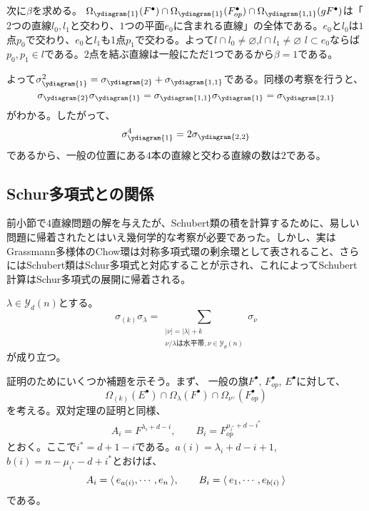 \documentclass{ltjsreport}
\begin{document}
\begin{eg}
  次に$\beta$を求める。
  $\Omega_{\ydiagram{1}}(F^\bullet)\cap
  \Omega_{\ydiagram{1}}(F^\bullet_{op})\cap
  \Omega_{\ydiagram{1,1}}(gF^\bullet)$は「$2$つの直線$l_0,l_1$と交わり、$1$つの平面$e_0$に含まれる直線」の全体である。$e_0$と$l_0$は$1$点$p_0$で交わり、$e_0$と$l_1$も1点$p_1$で交わる。よって$l\cap l_0\neq\varnothing$,$l\cap l_1\neq\varnothing$ $l\subset e_0$ならば$p_0,p_1\in l$である。$2$点を結ぶ直線は一般にただ1つであるから$\beta=1$である。

  よって$\sigma_{\ydiagram{1}}^2=\sigma_{\ydiagram{2}}+\sigma_{\ydiagram{1,1}}$である。同様の考察を行うと、
  \[
  \sigma_{\ydiagram{2}}\sigma_{\ydiagram{1}}=\sigma_{\ydiagram{1,1}}\sigma_{\ydiagram{1}}=\sigma_{\ydiagram{2,1}}  
  \]
  がわかる。したがって、
  \[
  \sigma_{\ydiagram{1}}^4=2\sigma_{\ydiagram{2,2}}  
  \]
  であるから、一般の位置にある$4$本の直線と交わる直線の数は$2$である。
\end{eg}


\subsection{Schur多項式との関係}

前小節で4直線問題の解を与えたが、Schubert類の積を計算するために、易しい問題に帰着されたとはいえ幾何学的な考察が必要であった。しかし、実はGrassmann多様体のChow環は対称多項式環の剰余環として表されること、さらにはSchubert類はSchur多項式と対応することが示され、これによってSchubert計算はSchur多項式の展開に帰着される。


\begin{theo}[Pieriの規則]\label{Pieri_formula}
  $\lambda\in\mathcal{Y}_d(n)$とする。
  \[
  \sigma_{(k)}\sigma_\lambda=\sum_{\substack{|\nu|=|\lambda|+k\\\nu/\lambda\text{は水平帯},\nu\in\mathcal{Y}_d(n)}}\sigma_\nu
  \]
  が成り立つ。
\end{theo}

証明のためにいくつか補題を示そう。まず、
一般の旗$F^\bullet$, $F^\bullet_{op}$, $E^\bullet$に対して、
\[
\Omega_{(k)}(E^\bullet)\cap \Omega_\lambda(F^\bullet)\cap \Omega_{\nu^\vee}(F^\bullet_{op})
\]
を考える。双対定理の証明と同様、
\begin{align*}
  A_i=F^{\lambda_i+d-i},\qquad B_i=F_{op}^{\mu_{i^*}+d-i^*}
\end{align*}
とおく。ここで$i^*=d+1-i$である。$a(i)=\lambda_i+d-i+1$, $b(i)=n-\mu_{i^*}-d+i^*$とおけば、
\[
A_i=\langle\:e_{a(i)},\cdots,e_n\:\rangle,\qquad B_i=\langle\:e_1,\cdots,e_{b(i)}\:\rangle  
\]
である。
\end{document}
